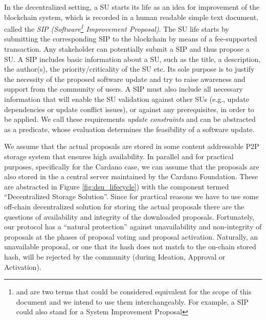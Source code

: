 In the decentralized setting, a SU starts its life as an idea for improvement of
the blockchain system, which is recorded in a human readable simple text
document, called the \emph{SIP (Software\footnote{ and
     are two terms that could be considered equivalent for the scope
    of this document and we intend to use them interchangeably. For example, a SIP
    could also stand for a System Improvement Proposal} Improvement Proposal)}.
The SU life starts by submitting the corresponding SIP to the blockchain by
means of a fee-supported
 transaction. Any stakeholder can potentially submit a SIP and thus propose a SU.
A SIP includes basic information about a SU, such as the title, a description,
the author(s), the priority/criticality of the SU etc. Its sole purpose is to
justify the necessity of the proposed software update and try to raise
awareness and support from the community of users. A SIP must also include all
necessary information that will enable the SU validation against other SUs
(e.g., update dependencies or update conflict issues), or against any
prerequisites, in order to be applied. We call these requirements
\emph{update constraints} and can be abstracted as a predicate, whose
evaluation determines the feasibility of a software update.

We assume that the actual proposals are stored in some content addressable P2P
storage system that ensures
high availability. In parallel and for practical purposes, specifically for the
Cardano case, we can assume that
the proposals are also stored in the a central server maintained by the Cardano
Foundation. These are abstracted
in Figure
\ref{fig:dsu_lifecycle}) with the component termed ``Decentralized Storage
Solution''. Since for practical reasons we have
to use some off-chain decentralized solution for storing the actual proposals
there are the questions of availability and integrity of the downloaded
proposals. Fortunately, our protocol has a ``natural protection'' against
unavailability and non-integrity of proposals at the phases of proposal voting
and proposal activation. Naturally, an unavailable proposal, or one that its
hash does not match to the on-chain stored hash, will be rejected by the
community (during Ideation, Approval or Activation).

